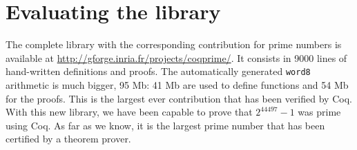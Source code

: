\section{Evaluating the library \label{bench}}

The complete library with the corresponding contribution for prime numbers is available at \url{http://gforge.inria.fr/projects/coqprime/}. It consists in 9000 lines of hand-written
definitions and proofs. The automatically generated {\tt word8} arithmetic is much bigger,
95 Mb: 41 Mb are used to define functions and 54 Mb for the proofs. This is the largest ever
contribution that has been verified by {\sc Coq}. With this new library, we have been capable to
prove that $2^{44497} - 1$ was prime using {\sc Coq}. As far as we know, it is the largest 
prime number  that has been certified by a theorem prover.

